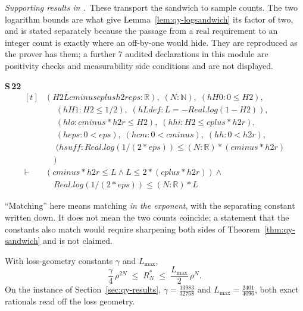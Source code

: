 
\noindent\emph{Supporting results in .}~These transport the sandwich to sample counts. The two logarithm bounds are what give Lemma~\ref{lem:qy-logsandwich} its factor of two, and  is stated separately because the passage from a real requirement to an integer count is exactly where an off-by-one would hide. They are reproduced as the prover has them; a further $7$ audited declarations in this module are positivity checks and measurability side conditions and are not displayed.

\noindent\textbf{S\,22}\quad{}
{\footnotesize\[ \begin{aligned}[t]
&(\mathit{H2} \mathit{L} \mathit{cminus} \mathit{cplus} \mathit{h2r} \mathit{eps} : \mathbb{R} ),\; (\mathit{N} : \mathbb{N} ),\; (\mathit{hH0} : 0 \leq \mathit{H2}),\\
&\quad \; (\mathit{hH1} : \mathit{H2} \leq 1/2),\; (\mathit{hLdef} : \mathit{L} = -\mathit{Real}.\mathit{log} (1 - \mathit{H2})),\\
&\quad \; (\mathit{hlo} : \mathit{cminus} * \mathit{h2r} \leq \mathit{H2}),\; (\mathit{hhi} : \mathit{H2} \leq \mathit{cplus} * \mathit{h2r}),\\
&\quad \; (\mathit{heps} : 0 < \mathit{eps}),\; (\mathit{hcm} : 0 < \mathit{cminus}),\; (\mathit{hh} : 0 < \mathit{h2r}),\\
&\quad \; (\mathit{hsuff} : \mathit{Real}.\mathit{log} (1 / (2 * \mathit{eps})) \leq (\mathit{N} : \mathbb{R} ) * (\mathit{cminus} * \mathit{h2r})\\
&\quad )\\
\vdash\;&(\mathit{cminus} * \mathit{h2r} \leq \mathit{L} \wedge \mathit{L} \leq 2 * (\mathit{cplus} * \mathit{h2r})) \wedge\\
&\quad \mathit{Real}.\mathit{log} (1 / (2 * \mathit{eps})) \leq (\mathit{N} : \mathbb{R} ) * \mathit{L}
\end{aligned} \]}


``Matching'' here means matching \emph{in the exponent}, with the separating constant written
down. It does not mean the two counts coincide; a statement that the constants also match
would require sharpening both sides of Theorem~\ref{thm:qy-sandwich} and is not claimed.

\begin{theorem}
\label{thm:qy-regret}
With loss-geometry constants $\gamma$ and $L_{\max}$,
\begin{equation}
\frac{\gamma}{4}\,\rho^{2N}\;\leq\;R_{N}^{*}\;\leq\;\frac{L_{\max}}{2}\,\rho^{N}.
\label{eq:qy-regret}
\end{equation}
On the instance of Section~\ref{sec:qy-results}, $\gamma=\tfrac{13983}{32768}$ and
$L_{\max}=\tfrac{2401}{4096}$, both exact rationals read off the loss geometry.
\end{theorem}

